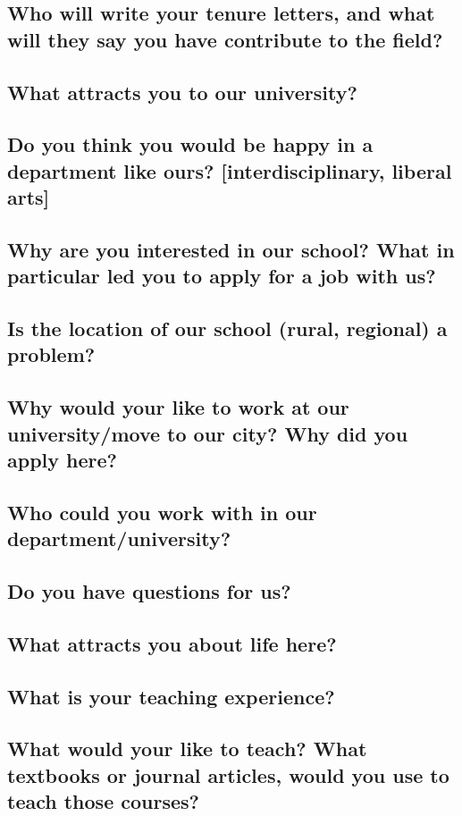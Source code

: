 \documentclass[12pt]{article}
\theoremstyle{plain}
\theoremstyle{plain}
\theoremstyle{plain}
\theoremstyle{plain}
\theoremstyle{plain}
\theoremstyle{plain}
\begin{document}
\subsection{Who will write your tenure letters, and what will they say you have contribute to the field?}
\label{sec:org2ef6dae}
\subsection{What attracts you to our university?}
\label{sec:org2081794}
\subsection{Do you think you would be happy in a department like ours? [interdisciplinary, liberal arts]}
\label{sec:org236418a}
\subsection{Why are you interested in our school? What in particular led you to apply for a job with us?}
\label{sec:org6e95a66}
\subsection{Is the location of our school (rural, regional) a problem?}
\label{sec:org316102a}
\subsection{Why would your like to work at our university/move to our city? Why did you apply here?}
\label{sec:org9f87746}
\subsection{Who could you work with in our department/university?}
\label{sec:orgcb3deb8}
\subsection{Do you have questions for us?}
\label{sec:org8d31651}
\subsection{What attracts you about life here?}
\label{sec:org0d40fff}
\subsection{What is your teaching experience?}
\label{sec:orged9b1bc}
\subsection{What would your like to teach? What textbooks or journal articles, would you use to teach those courses?}
\label{sec:org498a986}
\end{document}
